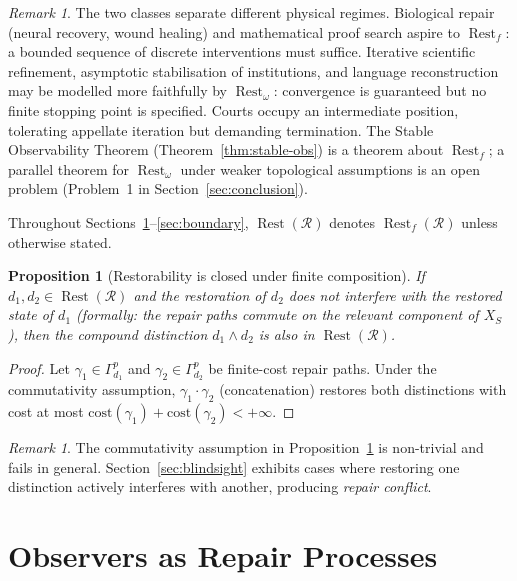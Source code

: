 \documentclass[12pt, oneside]{article}
\theoremstyle{plain}
\newtheorem{proposition}[theorem]{Proposition}
\theoremstyle{definition}
\theoremstyle{remark}
\newtheorem{remark}[theorem]{Remark}
\theoremstyle{definition}
\DeclareMathOperator{\Rest}{Rest}
\newcommand{\Restf}{\Rest_{f}}
\newcommand{\Reston}{\Rest_{\omega}}
\newcommand{\Xsub}{X_S}
\begin{document}
\begin{remark}
  The two classes separate different physical regimes.
  Biological repair (neural recovery, wound healing) and mathematical
  proof search aspire to $\Restf$: a bounded sequence of discrete
  interventions must suffice.
  Iterative scientific refinement, asymptotic stabilisation of
  institutions, and language reconstruction may be modelled more
  faithfully by $\Reston$: convergence is guaranteed but no finite
  stopping point is specified.
  Courts occupy an intermediate position, tolerating appellate
  iteration but demanding termination.
  The Stable Observability Theorem (Theorem~\ref{thm:stable-obs}) is
  a theorem about $\Restf$; a parallel theorem for $\Reston$ under
  weaker topological assumptions is an open problem
  (Problem~1 in Section~\ref{sec:conclusion}).
\end{remark}

Throughout Sections~\ref{sec:observer}--\ref{sec:boundary},
$\Rest(\mathcal{R})$ denotes $\Restf(\mathcal{R})$ unless otherwise
stated.

\begin{proposition}[Restorability is closed under finite composition]
  If $d_1, d_2 \in \Rest(\mathcal{R})$ and the restoration of $d_2$
  does not interfere with the restored state of $d_1$ (formally: the
  repair paths commute on the relevant component of $\Xsub$), then
  the compound distinction $d_1 \wedge d_2$ is also in
  $\Rest(\mathcal{R})$.
  \label{prop:closure}
\end{proposition}

\begin{proof}
  Let $\gamma_1 \in \Gamma_{d_1}^p$ and $\gamma_2 \in \Gamma_{d_2}^p$
  be finite-cost repair paths.
  Under the commutativity assumption, $\gamma_1 \cdot \gamma_2$
  (concatenation) restores both distinctions with cost at most
  $\mathrm{cost}(\gamma_1) + \mathrm{cost}(\gamma_2) < +\infty$.
\end{proof}

\begin{remark}
  The commutativity assumption in Proposition~\ref{prop:closure} is
  non-trivial and fails in general.
  Section~\ref{sec:blindsight} exhibits cases where restoring one
  distinction actively interferes with another,
  producing \emph{repair conflict}.
\end{remark}


\section{Observers as Repair Processes}
\label{sec:observer}
\end{document}
